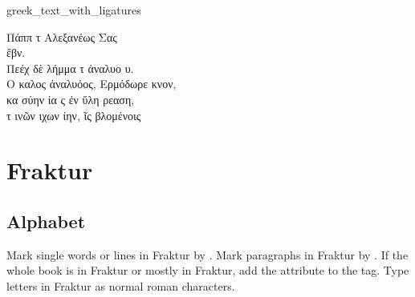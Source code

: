 \begin{sampleImage}{greek_text_with_ligatures}
\begin{typeGreek}
Πάππ τ Αλεξανέως Σας  \\
ἕβν. \\
Πεέχ δὲ λήμμα τ ἀναλυο υ. \\
Ο καλος ἀναλυόος, Ερμόδωρε κνον,  \\
κα σύην ἰα ς ἐν ὕλη ρεαση,  \\
 τ  ινῶν ιχων ίην, ῖς βλομένοις  \\
\someText {}
\end{typeGreek}
\end{sampleImage}


\section{Fraktur}
\label{section fraktur}

\tocspace
\subsection{Alphabet}
\label{section fraktur alphabet}


\begin{mainrule}
Mark single words or lines in Fraktur by . Mark paragraphs in Fraktur by . If the whole book is in Fraktur or mostly in Fraktur, add the  attribute to the  tag. Type letters in Fraktur as normal roman characters.
\end{mainrule}


